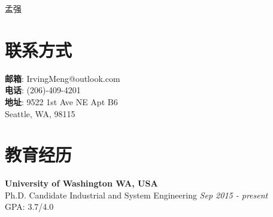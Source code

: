 \documentclass[margin,line,11pt]{resume}
\begin{document}
{\sc \Huge 孟强}

\begin{resume}



 
            \vspace{-0.5em}\section{\mysidestyle 联系方式}
    \textbf{邮箱}:\hspace{1.5em}  IrvingMeng@outlook.com \\
    \textbf{电话}: \hspace{1.5em} (206)-409-4201\\ 
    \textbf{地址}: \hspace{1.5em}9522 1st Ave NE Apt B6\\
     \hspace*{4.5em}Seattle, WA, 98115 


             \vspace{-0.5em}\section{\mysidestyle 教育经历}
     \textbf{University of Washington  \hfill WA, USA}\\
Ph.D. Candidate \quad  Industrial and System Engineering \hfill \textit{Sep 2015 - present}\\
 GPA: 3.7/4.0 \vspace{-1em}


\end{resume}
\end{document}
